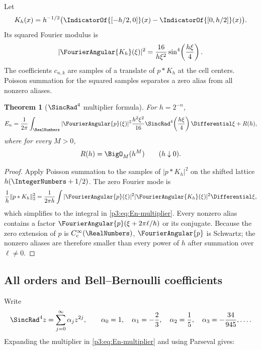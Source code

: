 \documentclass[11pt]{article}
\newtheorem{theorem}{Theorem}[section]
\theoremstyle{definition}
\theoremstyle{remark}
\begin{document}
Let
\begin{equation}\label{p3:eq:Kh-def}
 K_h(x)=h^{-1/2}
 \bigl(\IndicatorOf{[-h/2,0]}(x)-\IndicatorOf{[0,h/2]}(x)\bigr).
\end{equation}
Its squared Fourier modulus is
\begin{equation}\label{p3:eq:Kh-transform}
 |\FourierAngular{K_h}(\xi)|^2
 =\frac{16}{h\xi^2}\sin^4\!\left(\frac{h\xi}{4}\right).
\end{equation}
The coefficients $c_{n,k}$ are samples of a translate of $p*K_h$ at the cell
centers.  Poisson summation for the squared samples separates a zero alias from
all nonzero aliases.

\begin{theorem}[$\SincRad^4$ multiplier formula]
\label{p3:thm:sinc4-energy}
For $h=2^{-n}$,
\begin{equation}\label{p3:eq:En-multiplier}
 E_n=\frac1{2\pi}\int_\RealNumbers|\FourierAngular{p}(\xi)|^2
 \frac{h^2\xi^2}{16}\SincRad^4\!\left(\frac{h\xi}{4}\right)\Differential\xi
 +R(h),
\end{equation}
where for every $M>0$,
\begin{equation}\label{p3:eq:alias-superalgebraic}
 R(h)=\BigO_M(h^M)\qquad(h\downarrow0).
\end{equation}
\end{theorem}

\begin{proof}
Apply Poisson summation to the samples of $|p*K_h|^2$ on the shifted lattice
$h(\IntegerNumbers+1/2)$.  The zero Fourier mode is
\[
 \frac1h\|p*K_h\|_2^2
 =\frac1{2\pi h}\int|\FourierAngular{p}(\xi)|^2
 |\FourierAngular{K_h}(\xi)|^2\Differential\xi,
\]
which simplifies to the integral in \eqref{p3:eq:En-multiplier}.  Every nonzero
alias contains a factor $\FourierAngular{p}(\xi+2\pi\ell/h)$ or its conjugate.
Because the zero extension of $p$ is $C_c^\infty(\RealNumbers)$,
$\FourierAngular{p}$ is Schwartz; the nonzero aliases are therefore smaller than every
power of $h$ after summation over $\ell\ne0$.
\end{proof}

\subsection{All orders and Bell--Bernoulli coefficients}

Write
\begin{equation}\label{p3:eq:alpha-sinc4}
 \SincRad^4z=\sum_{j=0}^\infty\alpha_jz^{2j},
 \qquad
 \alpha_0=1,\quad \alpha_1=-\frac23,
 \quad \alpha_2=\frac15,
 \quad \alpha_3=-\frac{34}{945},\ldots.
\end{equation}
Expanding the multiplier in \eqref{p3:eq:En-multiplier} and using Parseval gives:
\end{document}
